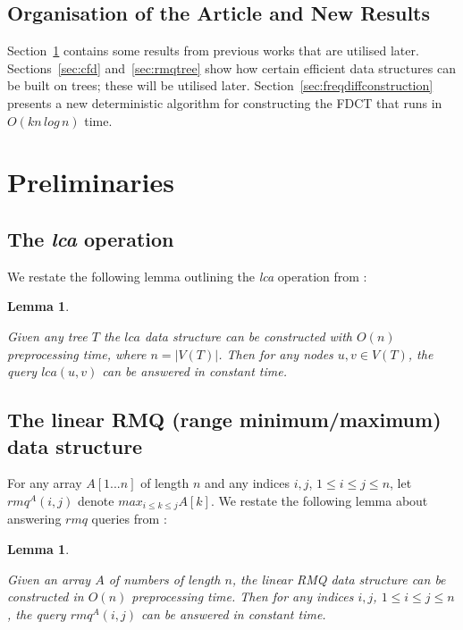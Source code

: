 \documentclass{article}
\newtheorem{lca}[incompatibility]{Lemma}
\newtheorem{linearrmq}[incompatibility]{Lemma}
\begin{document}
    \subsection{Organisation of the Article and New Results}
    Section~\ref{sec:preliminaries} contains some results from previous works that are utilised later. Sections~\ref{sec:cfd} and~\ref{sec:rmqtree} show how certain efficient data structures can be built on trees; these will be utilised later. Section~\ref{sec:freqdiffconstruction} presents a new deterministic algorithm for constructing the FDCT that runs in $O(kn\,log\,n)$ time.

    \section{Preliminaries}
    \label{sec:preliminaries}

    \subsection{The \textit{lca} operation}

    We restate the following lemma outlining the \textit{lca} operation from \cite{bender2000lca}:
    \newline

    \begin{lca}
        \label{lem:lca}

        Given any tree $T$ the $lca$ data structure can be constructed with $O(n)$ preprocessing time, where $n = |V(T)|$. Then for any nodes $u, v \in V(T)$, the query $lca(u, v)$ can be answered in constant time.
    \end{lca}

    \subsection{The linear RMQ (range minimum/maximum) data structure}

    For any array $A[1 ... n]$ of length $n$ and any indices $i, j$, $1 \leq i \leq j \leq n$, let $rmq^A(i, j)$ denote $max_{i \leq k \leq j}A[k]$. We restate the following lemma about answering $rmq$ queries from \cite{bender2000lca}:
    \newline

    \begin{linearrmq}
        \label{lem:linearrmq}

        Given an array $A$ of numbers of length $n$, the \textit{linear RMQ data structure} can be constructed in $O(n)$ preprocessing time. Then for any indices $i, j$, $1 \leq i \leq j \leq n$, the query $rmq^A(i, j)$ can be answered in constant time.
    \end{linearrmq}
\end{document}

